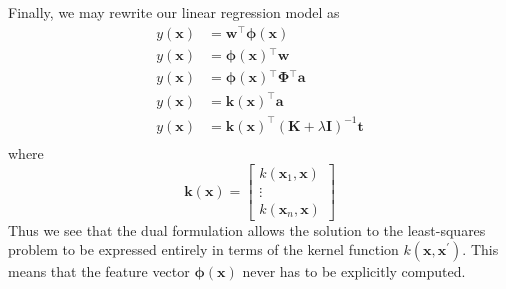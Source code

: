 \documentclass[12pt]{article}
\newcommand{\x}{\mathbf{x}}
\newcommand{\w}{\mathbf{w}}
\newcommand{\tVec}{\mathbf{t}}
\newcommand{\aVec}{\mathbf{a}}
\newcommand{\phiX}{\mathbf{\phi}\left(\x{}\right)}
\newcommand{\PhiMat}{\mathbf{\Phi}}
\newcommand{\K}{\mathbf{K}}
\newcommand{\I}{\mathbf{I}}
\begin{document}
%
Finally, we may rewrite our linear regression model as
%
\begin{align*}
  y\left(\x{}\right) &= \w{}^\top\phiX{}\\
  y\left(\x{}\right) &= \phiX{}^\top\w{}\\
  y\left(\x{}\right) &= \phiX{}^\top\PhiMat{}^\top\aVec{}\\
  y\left(\x{}\right) &= \mathbf{k}\left(\x{}\right)^\top\aVec{}\\
  y\left(\x{}\right) &= \mathbf{k}\left(\x{}\right)^\top\left(\K{} + \lambda\I{}\right)^{-1}\tVec{}\\
\end{align*}
%
where
%
\begin{equation*}
  \mathbf{k}\left(\x{}\right) = 
  \left[\begin{matrix}
    k\left(\x{}_1, \x{}\right)\\
    \vdots\\
    k\left(\x{}_n, \x{}\right)
  \end{matrix}\right]
\end{equation*}
%
Thus we see that the dual formulation allows the solution to the least-squares
problem to be expressed entirely in terms of the kernel function
$k\left(\x{}, \x{}^\prime\right)$. This means that the feature vector $\phiX{}$
never has to be explicitly computed.
\end{document}
